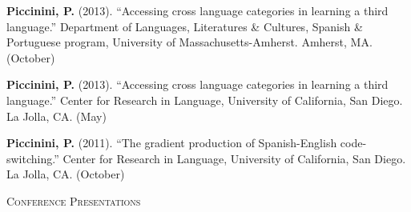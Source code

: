 \documentclass[9pt]{article}
\newenvironment{changemargin}[2]{%
  \begin{list}{}{%
    \setlength{\topsep}{0pt}%
    \setlength{\leftmargin}{#1}%
    \setlength{\rightmargin}{#2}%
    \setlength{\listparindent}{\parindent}%
    \setlength{\itemindent}{\parindent}%
    \setlength{\parsep}{\parskip}%
  }%
  \item[]}{\end{list}
}
\newcommand{\lineover}{
	\begin{changemargin}{-0.05in}{-0.05in}
		\vspace*{-8pt}
		\hrulefill \\
		\vspace*{-2pt}
	\end{changemargin}
}
\newcommand{\header}[1]{
	\begin{changemargin}{-0.5in}{-0.5in}
		\scshape{#1}\\
  	\lineover
	\end{changemargin}
}
\newenvironment{body} {
	\vspace*{-16pt}
	\begin{changemargin}{-0.25in}{-0.5in}
  }	
	{\end{changemargin}
}
\begin{document}
\begin{body}
	\vspace{14pt}

	\textbf{Piccinini, P.} (2013). ``Accessing cross language categories in learning a third language.''  Department of Languages, Literatures \& Cultures, Spanish \& Portuguese program, University of Massachusetts-Amherst. Amherst, MA. (October)\\
	\medskip
	
	\textbf{Piccinini, P.} (2013). ``Accessing cross language categories in learning a third language.''  Center for Research in Language, University of California, San Diego. La Jolla, CA. (May)\\
	\medskip
	
	\textbf{Piccinini, P.} (2011). ``The gradient  production of Spanish-English code-switching.''  Center for Research in Language, University of California, San Diego. La Jolla, CA. (October)\\
	\medskip
	
\end{body}

\smallskip



\header{Conference Presentations}
\end{document}
